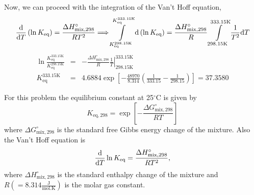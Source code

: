 \documentclass[calculator,steamtables,allquestions,datasheet]{exam_newMarcus2}
\newcommand{\frc}{\displaystyle\frac}
\renewcommand{\d}[1]{\mathrm{d} #1 }
\begin{document}
\begin{question}
\begin{enumerate}[(a)]
{\begin{displaymath}
          \end{displaymath}
           Now, we can proceed with the integration of the Van't Hoff equation,~
          \begin{displaymath} 
              \frc{\d}{\d T} \left(\ln{K_{\text{eq}}}\right) = \frc{\Delta H^{\circ}_{\text{mix},298}}{RT^{2}} \Longrightarrow \int\limits_{K_{\text{eq}}^{298.15\text{K}}}^{K_{\text{eq}}^{333.15\text{K}}} \d\left(\ln{K_{\text{eq}}}\right) = \frc{\Delta H^{\circ}_{\text{mix},298}}{R}\int\limits_{298.15\text{K}}^{333.15\text{K}}\frc{1}{T^{2}}\d T
          \end{displaymath}
          \begin{eqnarray}
              \ln{\frc{K_{\text{eq}}^{333.15\text{K}}}{K_{\text{eq}}^{298.15\text{K}}}} &=& -\frc{\Delta H^{\circ}_{\text{mix},298}}{R} \left.\frc{1}{T}\right|_{298.15\text{K}}^{333.15\text{K}} \nonumber \\
             K_{\text{eq}}^{333.15\text{K}} &=&  4.6884 \exp{ \left[-\frc{48970}{8.314}\left(\frc{1}{333.15} - \frc{1}{298.15}\right)\right] } = 37.3580 \nonumber 
           \end{eqnarray}

}
%
\end{enumerate}
        For this problem the equilibrium constant at 25$^{\circ}$C is given by
          \begin{displaymath}
              K_{\text{eq},298} = \exp{\left[-\frc{\Delta G^{\circ}_{\text{mix},298}}{R T}\right]}
          \end{displaymath}
          where $\Delta G^{\circ}_{\text{mix},298}$ is the standard free Gibbs energy change of the mixture. Also the Van't Hoff equation is
          \begin{displaymath}
               \frc{\d}{\d T} \ln{K_{\text{eq}}} = \frc{\Delta H^{\circ}_{\text{mix},298}}{RT^{2}},
          \end{displaymath}
          where $\Delta H^{\circ}_{\text{mix},298}$ is the standard enthalpy change of the mixture and $R\left(=8.314\frc{\text{J}}{\text{mol.K}}\right)$ is the molar gas constant.
%
\end{question}

\clearpage
\end{document}
